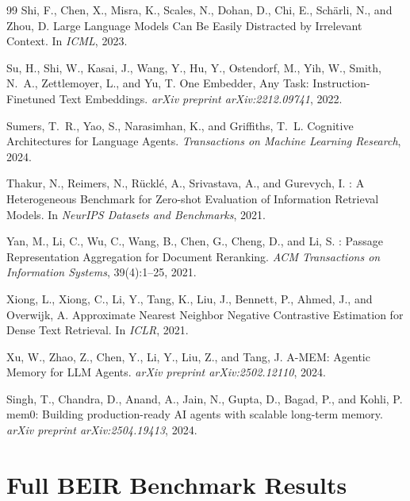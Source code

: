 \documentclass[11pt]{article}
\begin{document}
\begin{thebibliography}{99}
Shi, F., Chen, X., Misra, K., Scales, N., Dohan, D., Chi, E., Sch{\"a}rli, N., and
  Zhou, D.
\newblock Large Language Models Can Be Easily Distracted by Irrelevant Context.
\newblock In \emph{ICML}, 2023.

Su, H., Shi, W., Kasai, J., Wang, Y., Hu, Y., Ostendorf, M., Yih, W., Smith, N.~A.,
  Zettlemoyer, L., and Yu, T.
\newblock One Embedder, Any Task: Instruction-Finetuned Text Embeddings.
\newblock \emph{arXiv preprint arXiv:2212.09741}, 2022.

Sumers, T.~R., Yao, S., Narasimhan, K., and Griffiths, T.~L.
\newblock Cognitive Architectures for Language Agents.
\newblock \emph{Transactions on Machine Learning Research}, 2024.

Thakur, N., Reimers, N., R{\"u}ckl{\'e}, A., Srivastava, A., and Gurevych, I.
: A Heterogeneous Benchmark for Zero-shot Evaluation of Information
  Retrieval Models.
\newblock In \emph{NeurIPS Datasets and Benchmarks}, 2021.

Yan, M., Li, C., Wu, C., Wang, B., Chen, G., Cheng, D., and Li, S.
: Passage Representation Aggregation for Document Reranking.
\newblock \emph{ACM Transactions on Information Systems}, 39(4):1--25, 2021.

Xiong, L., Xiong, C., Li, Y., Tang, K., Liu, J., Bennett, P., Ahmed, J., and
  Overwijk, A.
\newblock Approximate Nearest Neighbor Negative Contrastive Estimation for Dense Text
  Retrieval.
\newblock In \emph{ICLR}, 2021.

Xu, W., Zhao, Z., Chen, Y., Li, Y., Liu, Z., and Tang, J.
\newblock A-MEM: Agentic Memory for LLM Agents.
\newblock \emph{arXiv preprint arXiv:2502.12110}, 2024.

Singh, T., Chandra, D., Anand, A., Jain, N., Gupta, D., Bagad, P., and Kohli, P.
\newblock mem0: Building production-ready AI agents with scalable long-term memory.
\newblock \emph{arXiv preprint arXiv:2504.19413}, 2024.

\end{thebibliography}
\appendix
\section{Full BEIR Benchmark Results}
\label{sec:appendix-beir}
\end{document}
